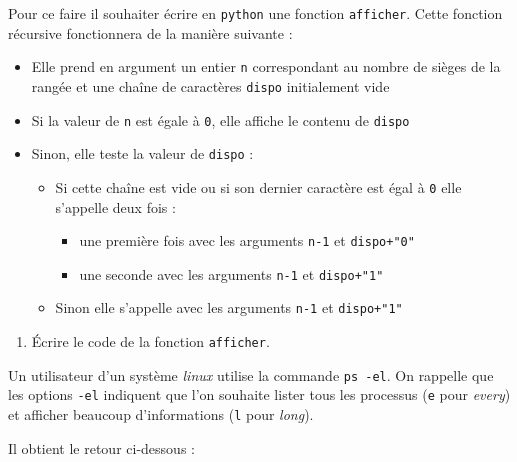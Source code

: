 \documentclass[a4paper, 11pt]{article}
\begin{document}
Pour ce faire il souhaiter écrire en \texttt{python} une fonction \texttt{afficher}. Cette fonction récursive fonctionnera de la manière suivante :
\begin{itemize}
	\item Elle prend en argument un entier \texttt{n} correspondant au nombre de sièges de la rangée et une chaîne de caractères \texttt{dispo} initialement vide
	\item Si la valeur de \texttt{n} est égale à \texttt{0}, elle affiche le contenu de \texttt{dispo}
	\item Sinon, elle teste la valeur de \texttt{dispo} :
		\begin{itemize}
			\item Si cette chaîne est vide ou si son dernier caractère est égal à \texttt{0} elle s'appelle deux fois :
				\begin{itemize}
					\item une première fois avec les arguments \texttt{n-1} et \texttt{dispo+"0"}
					\item une seconde avec les arguments \texttt{n-1} et \texttt{dispo+"1"}
				\end{itemize}
			\item Sinon elle s'appelle avec les arguments \texttt{n-1} et \texttt{dispo+"1"}     
		\end{itemize}
\end{itemize}

\begin{enumerate}
	\item \'Ecrire le code de la fonction \texttt{afficher}.
\end{enumerate}


\vspace{1em}

{\large{}}


Un utilisateur d'un système \textit{linux} utilise la commande \texttt{ps -el}. On rappelle que les options \texttt{-el} indiquent que l'on souhaite lister tous les processus (\texttt{e} pour \textit{every}) et afficher beaucoup d'informations (\texttt{l} pour \textit{long}).

Il obtient le retour ci-dessous :
\end{document}
